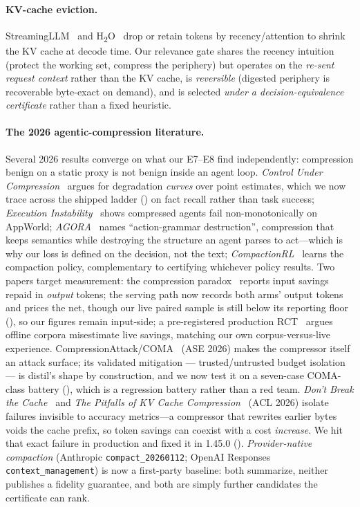 \documentclass{article}
\begin{document}
\paragraph{KV-cache eviction.} StreamingLLM~\cite{streamingllm} and
H\textsubscript{2}O~\cite{h2o} drop or retain tokens by recency/attention to shrink the
KV cache at decode time. Our relevance gate shares the recency intuition (protect the
working set, compress the periphery) but operates on the \emph{re-sent request context}
rather than the KV cache, is \emph{reversible} (digested periphery is recoverable
byte-exact on demand), and is selected \emph{under a decision-equivalence certificate}
rather than a fixed heuristic.
\paragraph{The 2026 agentic-compression literature.} Several 2026 results converge on what
our E7--E8 find independently: compression benign on a static proxy is not benign inside an
agent loop. \emph{Control Under Compression}~\cite{controlcompression} argues for
degradation \emph{curves} over point estimates, which we now trace across the shipped ladder
() on fact recall rather than task success; \emph{Execution
Instability}~\cite{execinstability} shows compressed agents fail non-monotonically on
AppWorld; \emph{AGORA}~\cite{agora} names ``action-grammar destruction'', compression that
keeps semantics while destroying the structure an agent parses to act---which is why our
loss is defined on the decision, not the text; \emph{CompactionRL}~\cite{compactionrl}
learns the compaction policy, complementary to certifying whichever policy results. Two
papers target measurement: the compression paradox~\cite{compressionparadox} reports input
savings repaid in \emph{output} tokens; the serving path now records both arms' output
tokens and prices the net, though our live paired sample is still below its reporting floor
(), so our figures remain input-side; a pre-registered production RCT~\cite{prodrct} argues offline corpora
misestimate live savings, matching our own corpus-versus-live experience.
CompressionAttack/COMA~\cite{coma} (ASE 2026) makes the compressor itself an attack
surface; its validated mitigation --- trusted/untrusted budget isolation --- is distil's shape
by construction, and we now test it on a seven-case COMA-class battery (),
which is a regression battery rather than a red team. \emph{Don't Break
the Cache}~\cite{dontbreakcache} and \emph{The Pitfalls of KV Cache
Compression}~\cite{kvpitfalls} (ACL 2026) isolate failures invisible to accuracy metrics---a
compressor that rewrites earlier bytes voids the cache prefix, so token savings can coexist
with a cost \emph{increase}. We hit that exact failure in production and fixed it in 1.45.0
(). \emph{Provider-native compaction} (Anthropic
\texttt{compact\_20260112}; OpenAI Responses \texttt{context\_management}) is now a
first-party baseline: both summarize, neither publishes a fidelity guarantee, and both are
simply further candidates the certificate can rank.
\end{document}
